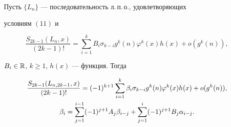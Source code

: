  


\begin{lem} 


Пусть $\{L_n\}$ --- последовательность л.\,п.\,о., удовлетворяющих 


условиям $(11)$ и 


\begin{equation} 


\frac{S_{2k-1}(L_n,x)}{(2k-1)!}=\sum^k_{i=1}B_i\sigma_{k-i} 


g^k(n)\varphi^k(x)h(x)+o(g^k(n)), 


\end{equation} 


$B_i\in\Bbb R$, $k\ge1$, $h(x)$ --- функция. Тогда 


\begin{gather} 


\frac{S_{2k-1}(L_{n,2k-1},x)}{(2k-1)!}=(-1)^{k+1} 


\sum^k_{i=1}\beta_i\sigma_{k-i}g^k(n) 


\varphi^k(x)h(x)+o(g^k(n)), \\ 


% 


\beta_i=\sum^{i-1}_{j=1}(-1)^{j+1}A_j \beta_{i-j} 


+\sum^i_{j=1}(-1)^{j+1}B_j\alpha_{i-j}.\notag 


\end{gather} 


\end{lem} 


 



